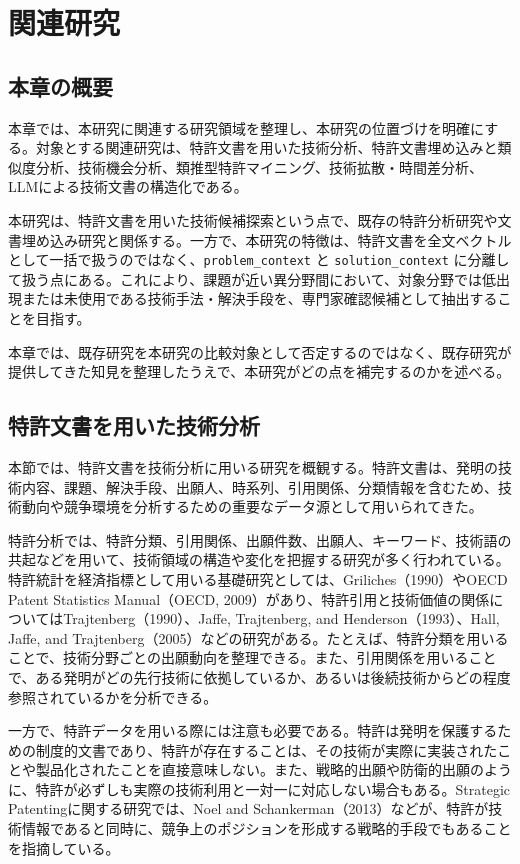\chapter{関連研究}

\section{本章の概要}

本章では、本研究に関連する研究領域を整理し、本研究の位置づけを明確にする。対象とする関連研究は、特許文書を用いた技術分析、特許文書埋め込みと類似度分析、技術機会分析、類推型特許マイニング、技術拡散・時間差分析、LLMによる技術文書の構造化である。

本研究は、特許文書を用いた技術候補探索という点で、既存の特許分析研究や文書埋め込み研究と関係する。一方で、本研究の特徴は、特許文書を全文ベクトルとして一括で扱うのではなく、\texttt{problem\_context} と \texttt{solution\_context} に分離して扱う点にある。これにより、課題が近い異分野間において、対象分野では低出現または未使用である技術手法・解決手段を、専門家確認候補として抽出することを目指す。

本章では、既存研究を本研究の比較対象として否定するのではなく、既存研究が提供してきた知見を整理したうえで、本研究がどの点を補完するのかを述べる。

\section{特許文書を用いた技術分析}

本節では、特許文書を技術分析に用いる研究を概観する。特許文書は、発明の技術内容、課題、解決手段、出願人、時系列、引用関係、分類情報を含むため、技術動向や競争環境を分析するための重要なデータ源として用いられてきた。

特許分析では、特許分類、引用関係、出願件数、出願人、キーワード、技術語の共起などを用いて、技術領域の構造や変化を把握する研究が多く行われている。特許統計を経済指標として用いる基礎研究としては、Griliches（1990）やOECD Patent Statistics Manual（OECD, 2009）があり、特許引用と技術価値の関係についてはTrajtenberg（1990）、Jaffe, Trajtenberg, and Henderson（1993）、Hall, Jaffe, and Trajtenberg（2005）などの研究がある。たとえば、特許分類を用いることで、技術分野ごとの出願動向を整理できる。また、引用関係を用いることで、ある発明がどの先行技術に依拠しているか、あるいは後続技術からどの程度参照されているかを分析できる。

一方で、特許データを用いる際には注意も必要である。特許は発明を保護するための制度的文書であり、特許が存在することは、その技術が実際に実装されたことや製品化されたことを直接意味しない。また、戦略的出願や防衛的出願のように、特許が必ずしも実際の技術利用と一対一に対応しない場合もある。Strategic Patentingに関する研究では、Noel and Schankerman（2013）などが、特許が技術情報であると同時に、競争上のポジションを形成する戦略的手段でもあることを指摘している。

